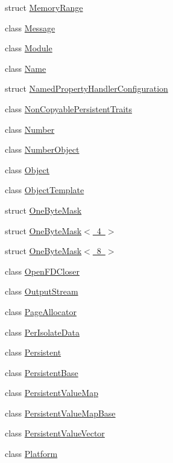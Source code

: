 \begin{DoxyCompactItemize}
struct \mbox{\hyperlink{structv8_1_1MemoryRange}{Memory\+Range}}
\item 
class \mbox{\hyperlink{classv8_1_1Message}{Message}}
\item 
class \mbox{\hyperlink{classv8_1_1Module}{Module}}
\item 
class \mbox{\hyperlink{classv8_1_1Name}{Name}}
\item 
struct \mbox{\hyperlink{structv8_1_1NamedPropertyHandlerConfiguration}{Named\+Property\+Handler\+Configuration}}
\item 
class \mbox{\hyperlink{classv8_1_1NonCopyablePersistentTraits}{Non\+Copyable\+Persistent\+Traits}}
\item 
class \mbox{\hyperlink{classv8_1_1Number}{Number}}
\item 
class \mbox{\hyperlink{classv8_1_1NumberObject}{Number\+Object}}
\item 
class \mbox{\hyperlink{classv8_1_1Object}{Object}}
\item 
class \mbox{\hyperlink{classv8_1_1ObjectTemplate}{Object\+Template}}
\item 
struct \mbox{\hyperlink{structv8_1_1OneByteMask}{One\+Byte\+Mask}}
\item 
struct \mbox{\hyperlink{structv8_1_1OneByteMask_3_014_01_4}{One\+Byte\+Mask$<$ 4 $>$}}
\item 
struct \mbox{\hyperlink{structv8_1_1OneByteMask_3_018_01_4}{One\+Byte\+Mask$<$ 8 $>$}}
\item 
class \mbox{\hyperlink{classv8_1_1OpenFDCloser}{Open\+F\+D\+Closer}}
\item 
class \mbox{\hyperlink{classv8_1_1OutputStream}{Output\+Stream}}
\item 
class \mbox{\hyperlink{classv8_1_1PageAllocator}{Page\+Allocator}}
\item 
class \mbox{\hyperlink{classv8_1_1PerIsolateData}{Per\+Isolate\+Data}}
\item 
class \mbox{\hyperlink{classv8_1_1Persistent}{Persistent}}
\item 
class \mbox{\hyperlink{classv8_1_1PersistentBase}{Persistent\+Base}}
\item 
class \mbox{\hyperlink{classv8_1_1PersistentValueMap}{Persistent\+Value\+Map}}
\item 
class \mbox{\hyperlink{classv8_1_1PersistentValueMapBase}{Persistent\+Value\+Map\+Base}}
\item 
class \mbox{\hyperlink{classv8_1_1PersistentValueVector}{Persistent\+Value\+Vector}}
\item 
class \mbox{\hyperlink{classv8_1_1Platform}{Platform}}

\end{DoxyCompactItemize}
